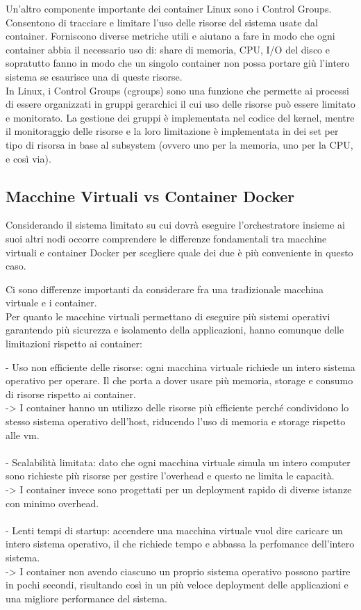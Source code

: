 \documentclass[12pt,a4paper]{article}
\begin{document}
Un'altro componente importante dei container Linux sono i Control Groups. Consentono di tracciare e limitare l'uso delle risorse del sistema usate dal container. Forniscono diverse metriche utili e aiutano a fare in modo che ogni container abbia il necessario uso di: share di memoria, CPU, I/O del disco e sopratutto fanno in modo che un singolo container non possa portare giù l'intero sistema se esaurisce una di queste risorse.\cite{docker_documentazione_security}\\In Linux, i Control Groups (cgroups) sono una funzione che permette ai processi di essere organizzati in gruppi gerarchici il cui uso delle risorse può essere limitato e monitorato. La gestione dei gruppi è implementata nel codice del kernel, mentre il monitoraggio delle risorse e la loro limitazione è implementata in dei set per tipo di risorsa in base al subsystem (ovvero uno per la memoria, uno per la CPU, e così via).\cite{man_cgroups}

\subsection{Macchine Virtuali vs Container Docker}
Considerando il sistema limitato su cui dovrà eseguire l'orchestratore insieme ai suoi altri nodi occorre comprendere le differenze fondamentali tra macchine virtuali e container Docker per scegliere quale dei due è più conveniente in questo caso. 

Ci sono differenze importanti da considerare fra una tradizionale macchina virtuale e i container.\\
Per quanto le macchine virtuali permettano di eseguire più sistemi operativi garantendo più sicurezza e isolamento della applicazioni, hanno comunque delle limitazioni rispetto ai container:

    - Uso non efficiente delle risorse: ogni macchina virtuale richiede un intero sistema operativo per operare. Il che porta a dover usare più memoria, storage e consumo di risorse rispetto ai container.\\
    -> I container hanno un utilizzo delle risorse più efficiente perché condividono lo stesso sistema operativo dell'host, riducendo l'uso di memoria e storage rispetto alle vm.\\\\
    - Scalabilità limitata: dato che ogni macchina virtuale simula un intero computer sono richieste più risorse per gestire l'overhead e questo ne limita le capacità.\\
    -> I container invece sono progettati per un deployment rapido di diverse istanze con minimo overhead.\\\\
    - Lenti tempi di startup: accendere una macchina virtuale vuol dire caricare un intero sistema operativo, il che richiede tempo e abbassa la perfomance dell'intero sistema.\\
    -> I container non avendo ciascuno un proprio sistema operativo possono partire in pochi secondi, risultando così in un più veloce deployment delle applicazioni e una migliore performance del sistema.\cite{oracle_docker}
\end{document}

